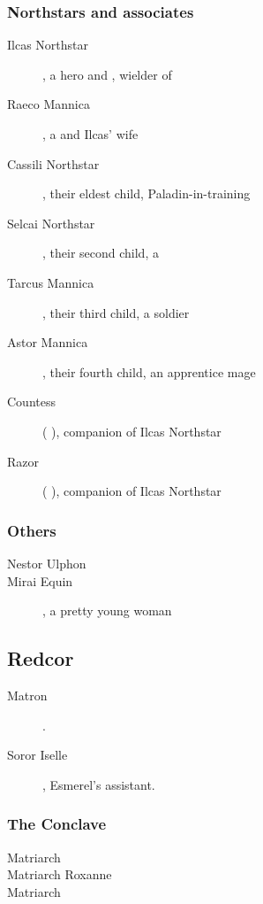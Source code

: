 \subsubsection{Northstars and associates}
\begin{description}
	\item[\IlcSR{} Ilcas Northstar], a hero and \nycaneer, wielder of \Telderain{} 
	\item[\Retaxis{} Raeco Mannica], a \nycaneer{} and Ilcas' wife
	\item[Cassili Northstar], their eldest child, Paladin-in-training 
	\item[Selcai Northstar], their second child, a \nycaneer{}
	\item[Tarcus Mannica], their third child, a soldier
	\item[Astor Mannica], their fourth child, an apprentice mage
	\item[Countess] (\nycan{} \female), companion of Ilcas Northstar
	\item[Razor] (\nycan{} \male), companion of Ilcas Northstar
\end{description}
\subsubsection{Others}
\begin{description}
	\item[\Ispan{} Nestor Ulphon]
	\item[Mirai Equin], a pretty young woman
\end{description}



\subsection{Redcor}
\begin{description}
	\item[Matron \Esmerel].
	\item[Soror Iselle], Esmerel's assistant.
\end{description}
\subsubsection{The Conclave}
\begin{description}
	\item[Matriarch \Dominice] 
	\item[Matriarch Roxanne]
	\item[Matriarch \Brizide]
\end{description}



